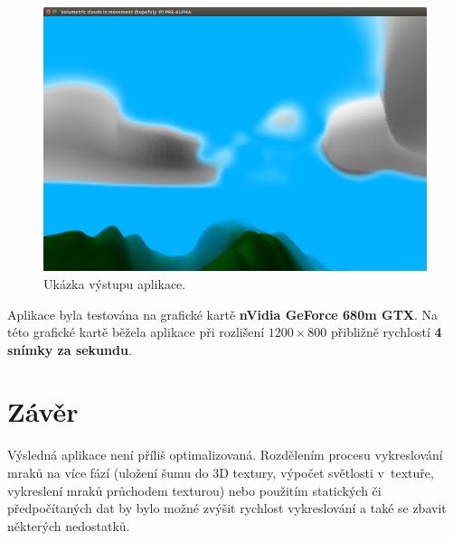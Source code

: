 \documentclass[a4paper, 12pt]{article}
\begin{document}
\begin{figure}
  \centering
  \includegraphics[width=15cm,keepaspectratio]{img/PGP-Clouds-01}
  \caption{Ukázka výstupu aplikace.}
  \label{fig:app-demo}
\end{figure}

Aplikace byla testována na grafické kartě \textbf{nVidia GeForce 680m GTX}.
Na této grafické kartě běžela aplikace při rozlišení $1200 \times 800$ přibližně
rychlostí \textbf{4 snímky za sekundu}.


\section{Závěr}


Výsledná aplikace není příliš optimalizovaná. Rozdělením procesu vykreslování
mraků na více fází (uložení šumu do 3D textury, výpočet světlosti v~textuře,
vykreslení mraků průchodem texturou) nebo použitím statických či předpočítaných
dat by bylo možné zvýšit rychlost vykreslování a také se zbavit některých nedostatků.



\begin{flushleft}
  
\end{flushleft}

\end{document}
